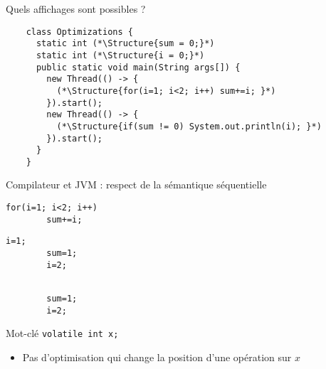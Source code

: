
\begingroup

\begin{frame}[fragile]{Quels affichages sont possibles ?}

  \begin{lstlisting}
    class Optimizations {
      static int (*\Structure{sum = 0;}*)
      static int (*\Structure{i = 0;}*)
      public static void main(String args[]) {
        new Thread(() -> {
          (*\Structure{for(i=1; i<2; i++) sum+=i; }*)
        }).start();
        new Thread(() -> {
          (*\Structure{if(sum != 0) System.out.println(i); }*)
        }).start();
      }
    }
  \end{lstlisting}
  
  \pause
  \vspace{-2mm}
  \begin{block}{Compilateur et JVM : respect de la sémantique séquentielle}
    \begin{minipage}{.35\textwidth}
      \begin{lstlisting}[gobble=6]
        for(i=1; i<2; i++)
        sum+=i;

      \end{lstlisting}
    \end{minipage}
    \pause
    \hspace{\fill}
    \begin{minipage}{.2\textwidth}
      \begin{lstlisting}[gobble=6]
        i=1;
        sum=1;
        i=2;
      \end{lstlisting}
    \end{minipage}
    \hspace{\fill}
    \pause
    \begin{minipage}{.2\textwidth}
      \begin{lstlisting}[gobble=6]
        
        sum=1;
        i=2;
      \end{lstlisting}
    \end{minipage}
  \end{block}

  \pause
  \begin{exampleblock}{Mot-clé \lstinline{volatile int x;}}
    \begin{itemize}
    \item Pas d'optimisation qui change la position d'une opération sur $x$
    \end{itemize}
  \end{exampleblock}

\end{frame}

\endgroup
\endinput
